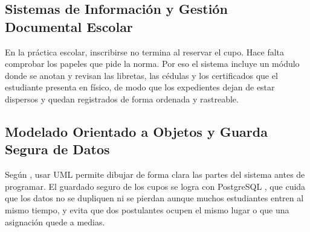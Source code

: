 \subsection{Sistemas de Información y Gestión Documental Escolar}

En la práctica escolar, inscribirse no termina al reservar el cupo. Hace falta comprobar los papeles que pide la norma. Por eso el sistema incluye un módulo donde se anotan y revisan las libretas, las cédulas y los certificados que el estudiante presenta en físico, de modo que los expedientes dejan de estar dispersos y quedan registrados de forma ordenada y rastreable.

\subsection{Modelado Orientado a Objetos y Guarda Segura de Datos}

Según \textcite{sommerville2020}, usar UML permite dibujar de forma clara las partes del sistema antes de programar. El guardado seguro de los cupos se logra con PostgreSQL \parencite{postgresql2025}, que cuida que los datos no se dupliquen ni se pierdan aunque muchos estudiantes entren al mismo tiempo, y evita que dos postulantes ocupen el mismo lugar o que una asignación quede a medias.
